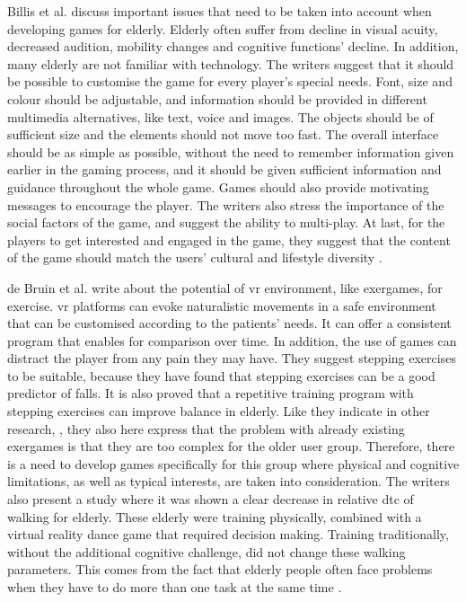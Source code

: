 Billis et al. \cite{Billis} discuss important issues that need to be taken into account when developing games for elderly. Elderly often suffer from decline in visual acuity, decreased audition, mobility changes and cognitive functions' decline. In addition, many elderly are not familiar with technology. The writers suggest that it should be possible to customise the game for every player's special needs. Font, size and colour should be adjustable, and information should be provided in different multimedia alternatives, like text, voice and images. The objects should be of sufficient size and the elements should not move too fast. The overall interface should be as simple as possible, without the need to remember information given earlier in the gaming process, and it should be given sufficient information and guidance throughout the whole game. Games should also provide motivating messages to encourage the player. The writers also stress the importance of the social factors of the game, and suggest the ability to multi-play. At last, for the players to get interested and engaged in the game, they suggest that the content of the game should match the users' cultural and lifestyle diversity \cite{Billis}.

de Bruin et al. \cite{bruin} write about the potential of \ac{vr} environment, like exergames, for exercise. \ac{vr} platforms can evoke naturalistic movements in a safe environment that can be customised according to the patients' needs. It can offer a consistent program that enables for comparison over time. In addition, the use of games can distract the player from any pain they may have. They suggest stepping exercises to be suitable, because they have found that stepping exercises can be a good predictor of falls. It is also proved that a repetitive training program with stepping exercises can improve balance in elderly. Like they indicate in other research, \cite{gerling1} \cite{exergamesforelderly}, they also here express that the problem with already existing exergames is that they are too complex for the older user group. Therefore, there is a need to develop games specifically for this group where physical and cognitive limitations, as well as typical interests, are taken into consideration. The writers also present a study where it was shown a clear decrease in relative \ac{dtc} of walking for elderly. These elderly were training physically, combined with a virtual reality dance game that required decision making. Training traditionally, without the additional cognitive challenge, did not change these walking parameters. This comes from the fact that elderly people often face problems when they have to do more than one task at the same time \cite{bruin}.

